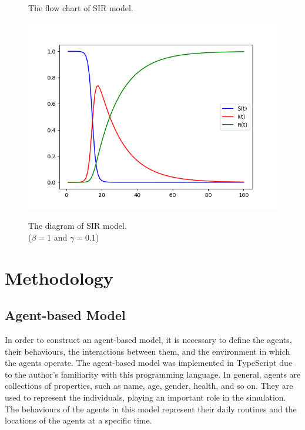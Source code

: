 \documentclass[12pt]{article}
\begin{document}
\begin{figure}[h]
	\begin{minipage}[h]{0.3\linewidth}
		\centering
		
        \caption{\scriptsize \sffamily The flow chart\cite{mediumGeneral} of SIR model. }
	\end{minipage}
	\begin{minipage}[h]{0.7\linewidth}
		\centering
		\includegraphics[width=\linewidth]{./assets/sir-graph.png}
        \label{fig:sir-chart}
        \caption{\scriptsize \sffamily The diagram\cite{sirGraph} of SIR model. \\ \quad($\beta=1$ and $\gamma=0.1$)}
	\end{minipage}
\end{figure}

\section{Methodology}

\subsection{Agent-based Model}
In order to construct an agent-based model, it is necessary to define the agents, their behaviours, the interactions between them, and the environment in which the agents operate. 
The agent-based model was implemented in TypeScript due to the author's familiarity with this programming language.
In general, agents are collections of properties, such as name, age, gender, health, and so on. They are used to represent the individuals, playing an important role in the simulation.
The behaviours of the agents in this model represent their daily routines and the locations of the agents at a specific time.
\end{document}
